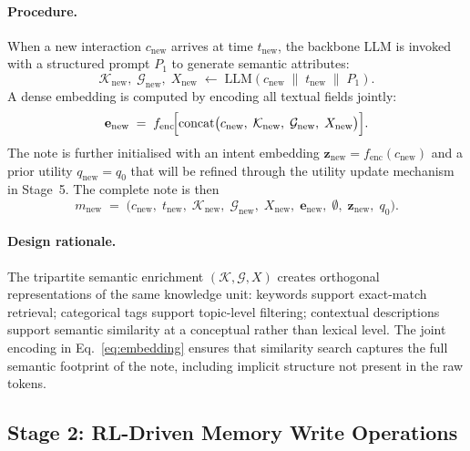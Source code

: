 \documentclass{article}
\newcommand{\note}{m}
\begin{document}
\paragraph{Procedure.}
When a new interaction $c_{\mathrm{new}}$ arrives at time $t_{\mathrm{new}}$,
the backbone LLM is invoked with a structured prompt $P_1$ to generate
semantic attributes:
\begin{equation}
  \mathcal{K}_{\mathrm{new}},\; \mathcal{G}_{\mathrm{new}},\; X_{\mathrm{new}}
  \;\leftarrow\;
  \mathrm{LLM}\!\left(c_{\mathrm{new}} \;\|\; t_{\mathrm{new}} \;\|\; P_1\right).
  \label{eq:note_construction}
\end{equation}
A dense embedding is computed by encoding all textual fields jointly:
\begin{equation}
  \mathbf{e}_{\mathrm{new}}
  \;=\;
  f_{\mathrm{enc}}\!\Bigl[\mathrm{concat}\bigl(
    c_{\mathrm{new}},\; \mathcal{K}_{\mathrm{new}},\;
    \mathcal{G}_{\mathrm{new}},\; X_{\mathrm{new}}\bigr)\Bigr].
  \label{eq:embedding}
\end{equation}
The note is further initialised with an intent embedding
$\mathbf{z}_{\mathrm{new}} = f_{\mathrm{enc}}(c_{\mathrm{new}})$ and a prior
utility $q_{\mathrm{new}} = q_0$ that will be refined through the utility
update mechanism in Stage~5.
The complete note is then
\begin{equation}
  \note_{\mathrm{new}}
  \;=\;
  \bigl(c_{\mathrm{new}},\; t_{\mathrm{new}},\;
        \mathcal{K}_{\mathrm{new}},\; \mathcal{G}_{\mathrm{new}},\;
        X_{\mathrm{new}},\; \mathbf{e}_{\mathrm{new}},\;
        \emptyset,\; \mathbf{z}_{\mathrm{new}},\; q_0\bigr).
  \label{eq:new_note}
\end{equation}

\paragraph{Design rationale.}
The tripartite semantic enrichment $(\mathcal{K}, \mathcal{G}, X)$ creates
orthogonal representations of the same knowledge unit: keywords support
exact-match retrieval; categorical tags support topic-level filtering;
contextual descriptions support semantic similarity at a conceptual rather
than lexical level.
The joint encoding in Eq.~\eqref{eq:embedding} ensures that similarity search
captures the full semantic footprint of the note, including implicit structure
not present in the raw tokens.

\subsection{Stage 2: RL-Driven Memory Write Operations}
\label{sec:stage2}
\end{document}

